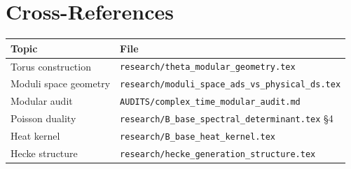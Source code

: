 \documentclass[11pt,a4paper]{article}
\begin{document}
\section{Cross-References}
\label{sec:xref}

\begin{tabular}{ll}
\hline
Topic & File \\
\hline
Torus construction & \texttt{research/theta\_modular\_geometry.tex} \\
Moduli space geometry & \texttt{research/moduli\_space\_ads\_vs\_physical\_ds.tex} \\
Modular audit & \texttt{AUDITS/complex\_time\_modular\_audit.md} \\
Poisson duality & \texttt{research/B\_base\_spectral\_determinant.tex} §4 \\
Heat kernel & \texttt{research/B\_base\_heat\_kernel.tex} \\
Hecke structure & \texttt{research/hecke\_generation\_structure.tex} \\
\hline
\end{tabular}
\end{document}
